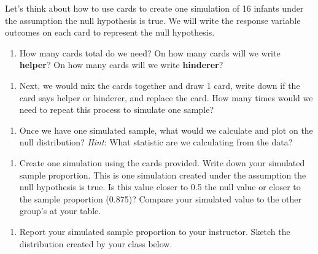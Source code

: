 \documentclass[
]{report}
\providecommand{\tightlist}{%
  \setlength{\itemsep}{0pt}\setlength{\parskip}{0pt}}
\begin{document}
Let's think about how to use cards to create one simulation of 16 infants under the assumption the null hypothesis is true. We will write the response variable outcomes on each card to represent the null hypothesis.

\begin{enumerate}
\def\labelenumi{\arabic{enumi}.}
\setcounter{enumi}{11}
\tightlist
\item
  How many cards total do we need? On how many cards will we write \textbf{helper}? On how many cards will we write \textbf{hinderer}?
\end{enumerate}

\vspace{0.5in}

\begin{enumerate}
\def\labelenumi{\arabic{enumi}.}
\setcounter{enumi}{12}
\tightlist
\item
  Next, we would mix the cards together and draw 1 card, write down if the card says helper or hinderer, and replace the card. How many times would we need to repeat this process to simulate one sample?
\end{enumerate}

\vspace{0.3in}

\begin{enumerate}
\def\labelenumi{\arabic{enumi}.}
\setcounter{enumi}{13}
\tightlist
\item
  Once we have one simulated sample, what would we calculate and plot on the null distribution? \emph{Hint}: What statistic are we calculating from the data?
\end{enumerate}

\vspace{0.5in}

\begin{enumerate}
\def\labelenumi{\arabic{enumi}.}
\setcounter{enumi}{14}
\tightlist
\item
  Create one simulation using the cards provided. Write down your simulated sample proportion. This is one simulation created under the assumption the null hypothesis is true. Is this value closer to 0.5 the null value or closer to the sample proportion (0.875)? Compare your simulated value to the other group's at your table.
\end{enumerate}

\vspace{0.8in}

\begin{enumerate}
\def\labelenumi{\arabic{enumi}.}
\setcounter{enumi}{15}
\tightlist
\item
  Report your simulated sample proportion to your instructor. Sketch the distribution created by your class below.
\end{enumerate}
\end{document}
